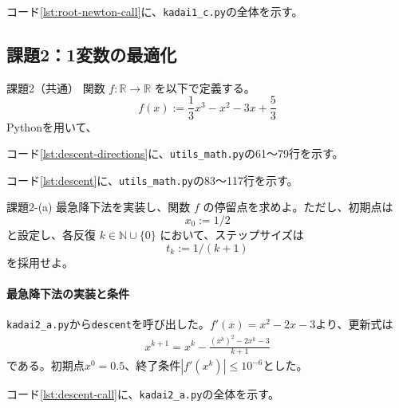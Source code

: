 \documentclass[a4j]{jarticle}
\begin{document}
\par\noindent
コード\ref{lst:root-newton-call}に、\texttt{kadai1\_c.py}の全体を示す。
\par




\subsection{課題2：1変数の最適化}
\begin{itembox}[l]{課題2（共通）}
関数 $f:\mathbb{R}\to\mathbb{R}$ を以下で定義する。
\[
f(x):=\frac{1}{3}x^3-x^2-3x+\frac{5}{3}
\]
Pythonを用いて、
\end{itembox}
\par\noindent
コード\ref{lst:descent-directions}に、\texttt{utils\_math.py}の61〜79行を示す。
\par




\par\noindent
コード\ref{lst:descent}に、\texttt{utils\_math.py}の83〜117行を示す。
\par



\begin{itembox}[l]{課題2-(a)}
最急降下法を実装し、関数 $f$ の停留点を求めよ。ただし、初期点は
\[
x_0:=1/2
\]
と設定し、各反復 $k\in\mathbb{N}\cup\{0\}$ において、ステップサイズは
\[
t_k:=1/(k+1)
\]
を採用せよ。
\end{itembox}
\paragraph{最急降下法の実装と条件}

\texttt{kadai2\_a.py}から\texttt{descent}を呼び出した。$f'(x)=x^2-2x-3$より、更新式は
\begin{align}
  x^{k+1}=x^k-\frac{(x^k)^2-2x^k-3}{k+1}
\end{align}
である。初期点$x^0=0.5$、終了条件$|f'(x^k)|\le10^{-6}$とした。

\par\noindent
コード\ref{lst:descent-call}に、\texttt{kadai2\_a.py}の全体を示す。
\par

\end{document}
